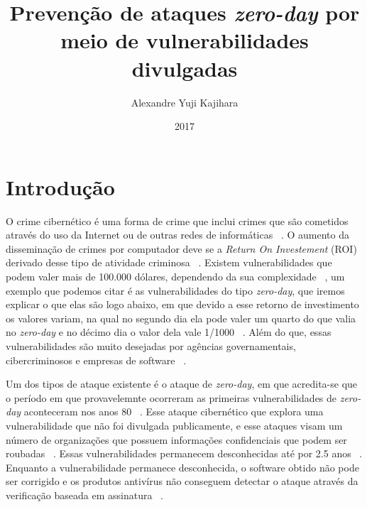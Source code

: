 \documentclass[brazil, utf8]{article}
\begin{document}
\title{Prevenção de ataques \textit{zero-day} por meio de vulnerabilidades divulgadas}
\author{Alexandre Yuji Kajihara}
\date{2017}

\maketitle 

\section{Introdução}
O crime cibernético é uma forma de crime que inclui crimes que são cometidos através do uso da Internet ou de outras redes de
informáticas ~\cite{Fotiet:2015}. O aumento da disseminação de crimes por computador deve se a \textit{Return On Investement}
(ROI) derivado desse tipo de atividade criminosa ~\cite{Fotiet:2015}. Existem vulnerabilidades que podem valer mais de 100.000 dólares, 
dependendo da sua complexidade ~\cite{Bilge:2012}, um exemplo que podemos citar é as vulnerabilidades do tipo \textit{zero-day}, que 
iremos explicar o que elas são logo abaixo, em que devido a esse retorno de investimento os valores variam, na qual no segundo dia ela 
pode valer um quarto do que valia no \textit{zero-day} e no décimo dia o valor dela vale 1/1000 ~\cite{Fotiet:2015}. Além do que, essas 
vulnerabilidades são muito desejadas por agências governamentais, cibercriminosos e empresas de software ~\cite{Kumar:2016}.

Um dos tipos de ataque existente é o ataque de \textit{zero-day}, em que acredita-se que o período em que provavelemnte ocorreram as 
primeiras vulnerabilidades de \textit{zero-day} aconteceram nos anos 80 ~\cite{Fotiet:2015}. Esse ataque cibernético que explora uma 
vulnerabilidade que não foi divulgada publicamente, e esse ataques visam um número de organizações que possuem informações confidenciais 
que podem ser roubadas ~\cite{Bilge:2012}. Essas vulnerabilidades permanecem desconhecidas até por 2.5 anos ~\cite{Bilge:2012}. Enquanto 
a vulnerabilidade permanece desconhecida, o software obtido não pode ser corrigido e os produtos antivírus não conseguem detectar o 
ataque através da verificação baseada em assinatura ~\cite{Bilge:2012}. 
\end{document}
